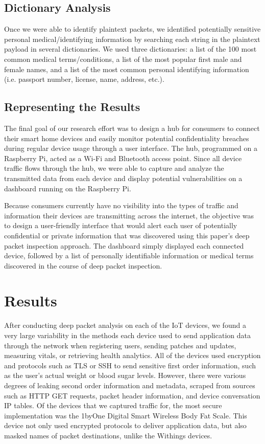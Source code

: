 \subsection{Dictionary Analysis}
Once we were able to identify plaintext packets, we identified potentially sensitive personal medical/identifying information by searching each string in the plaintext payload in several dictionaries. We used three dictionaries: a list of the 100 most common medical terms/conditions, a list of the most popular first male and female names, and a list of the most common personal identifying information (i.e. passport number, license, name, address, etc.). 

\subsection{Representing the Results}

The final goal of our research effort was to design a hub for consumers to connect their smart home devices and easily monitor potential confidentiality breaches during regular device usage through a user interface. The hub, programmed on a Raspberry Pi, acted as a Wi-Fi and Bluetooth access point. Since all device traffic flows through the hub, we were able to capture and analyze the transmitted data from each device and display potential vulnerabilities on a dashboard running on the Raspberry Pi. 

Because consumers currently have no visibility into the types of traffic and information their devices are transmitting across the internet, the objective was to design a user-friendly interface that would alert each user of potentially confidential or private information that was discovered using this paper's deep packet inspection approach. The dashboard simply displayed each connected device, followed by a list of personally identifiable information or medical terms discovered in the course of deep packet inspection. 

\section{Results}

After conducting deep packet analysis on each of the IoT devices, we found a very large variability in the methods each device used to send application data through the network when registering users, sending patches and updates, measuring vitals, or retrieving health analytics. All of the devices used encryption and protocols such as TLS or SSH to send sensitive first order information, such as the user's actual weight or blood sugar levels. However, there were various degrees of leaking second order information and metadata, scraped from sources such as HTTP GET requests, packet header information, and device conversation IP tables. Of the devices that we captured traffic for, the most secure implementation was the 1byOne Digital Smart Wireless Body Fat Scale. This device not only used encrypted protocols to deliver application data, but also masked names of packet destinations, unlike the Withings devices. 

